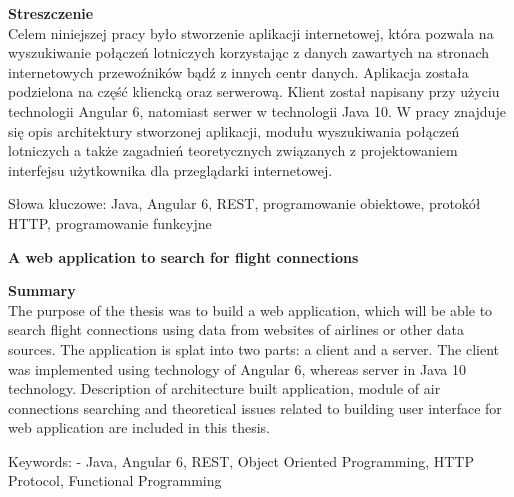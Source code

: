 \documentclass[12pt, twoside]{report}
\newcommand\tab[1][0.5cm]{\hspace*{#1}}
\newcommand\blankpage{%
	\null
    \thispagestyle{empty}%
    \newpage}
\begin{document}
\begin{flushleft}
	{\fontsize{14pt}{12pt}\selectfont
		\textbf{Streszczenie}}\\
	\vspace{1cm}
\tab Celem niniejszej pracy było stworzenie aplikacji internetowej, która pozwala na wyszukiwanie połączeń lotniczych korzystając z danych zawartych na stronach internetowych przewoźników bądź z innych centr danych. Aplikacja została podzielona na część kliencką oraz serwerową. Klient został napisany przy użyciu technologii Angular 6, natomiast serwer w technologii Java 10. W pracy znajduje się opis architektury stworzonej aplikacji, modułu wyszukiwania połączeń lotniczych a także zagadnień teoretycznych związanych z projektowaniem interfejsu użytkownika dla przeglądarki internetowej.
\end{flushleft}
\vspace{0.5cm}
Słowa kluczowe: Java, Angular 6, REST, programowanie obiektowe, protokół HTTP, programowanie funkcyjne

\vspace{1.5cm}

\begin{center}
	{\fontsize{14pt}{12pt}\selectfont
		\textbf{A web application to search for flight connections}}
\end{center}

\begin{flushleft}
	{\fontsize{14pt}{12pt}\selectfont
		\textbf{Summary}}\\
	\vspace{1cm}
\tab The purpose of the thesis was to build a web application, which will be able to search flight connections using data from websites of airlines or other data sources. The application is splat into two parts: a client and a server. The client was implemented using technology of Angular 6, whereas server in Java 10 technology. Description of architecture built application, module of air connections searching and theoretical issues related to building user interface for web application are included in this thesis. 
\end{flushleft}
\vspace{0.5cm}
Keywords: - Java, Angular 6, REST, Object Oriented Programming, HTTP Protocol, Functional Programming
\afterpage{\blankpage}


\renewcommand{\contentsname}{Spis treści}
\setcounter{page}{9}
\tableofcontents
\end{document}
